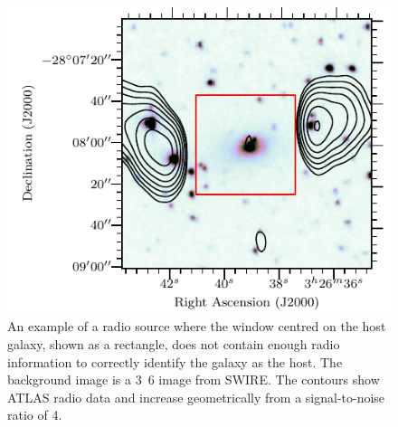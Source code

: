 \documentclass[fleqn,usenatbib,usedcolumn]{mnras}
\newcommand{\edited}[1]{#1}
\begin{document}
    \begin{figure}
      \centering
      \includegraphics[width=\linewidth]{images/CI2363_fig.pdf}
      \caption{An example of a radio source where the window centred on the
        host galaxy, shown as a rectangle, does not contain enough radio
        information to correctly identify the galaxy as the host. \edited{The background image
        is a \unit{3.6}{\micro\meter} image from SWIRE. The contours show ATLAS radio
        data and increase geometrically from a signal-to-noise ratio of 4.}}
      \label{fig:broken-window-size}
    \end{figure}
\end{document}
